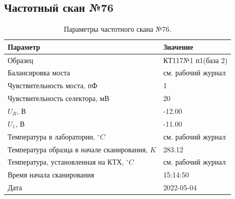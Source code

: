 \subsection{Частотный скан №76}
\begin{table}[!ht]
    \centering
    \caption{Параметры частотного скана №76.}
    \begin{tabular}{|l|l|}
        \hline
        Параметр                                       & Значение                  \\ \hline
        Образец                                        & КТ117№1 п1(база 2)        \\ \hline
        Балансировка моста                             & см. рабочий журнал        \\ \hline
        Чувствительность моста, пФ                     & 1                         \\ \hline
        Чувствительность селектора, мВ                 & 20                        \\ \hline
        $U_R$, В                                       & -12.00                    \\ \hline
        $U_1$, В                                       & -11.00                    \\ \hline
        Температура в лаборатории, $^\circ C$          & см. рабочий журнал        \\ \hline
        Температура образца в начале сканирования, $K$ & 283.12                    \\ \hline
        Температура, установленная на КТХ, $^\circ C$  & см. рабочий журнал        \\ \hline
        Время начала сканирования                      & 15:14:50                  \\ \hline
        Дата                                           & 2022-05-04                \\ \hline
    \end{tabular}
    \label{table:frequency_scan_76}
\end{table}

